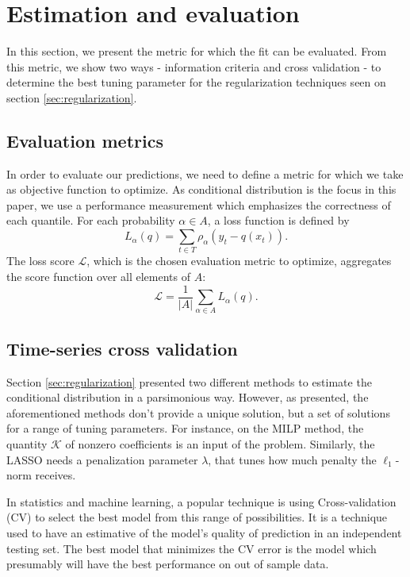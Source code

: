 \section{Estimation and evaluation}

In this section, we present the metric for which the fit can be evaluated. From this metric, we show two ways - information criteria and cross validation - to determine the best tuning parameter for the regularization techniques seen on section \ref{sec:regularization}.

\subsection{Evaluation metrics}
In order to evaluate our predictions, we need to define a metric for which we take as objective function to optimize. 
As conditional distribution is the focus in this paper, we use a performance measurement which emphasizes the correctness of each quantile. 
For each probability $\alpha \in A$, a loss function
is defined by
\begin{equation}
	L_\alpha(q)= \sum_{t\in T}\rho_{\alpha}(y_{t}-q(x_t)).
\end{equation}
The loss score $\mathcal{L}$, which is the chosen evaluation metric to optimize, aggregates the score function over all elements of $A$:
\begin{equation}
\mathcal{L}= \frac{1}{|A|}\sum_{\alpha \in A}L_\alpha(q).
\end{equation}




\subsection{Time-series cross validation}

Section \ref{sec:regularization} presented two different methods to estimate the conditional distribution in a parsimonious way. However, as presented, the aforementioned methods don't provide a unique solution, but a set of solutions for a range of tuning parameters. For instance, on the MILP method, the quantity $\mathcal{K}$ of nonzero coefficients is an input of the problem. Similarly, the LASSO needs a penalization parameter $\lambda$, that tunes how much penalty the $\ell_1$-norm receives.

In statistics and machine learning, a popular technique is using Cross-validation (CV) to select the best model from this range of possibilities.
It is a technique used to have an estimative of the model's quality of prediction in an independent testing set. The best model that minimizes the CV error is the model which presumably will have the best performance on out of sample data.

